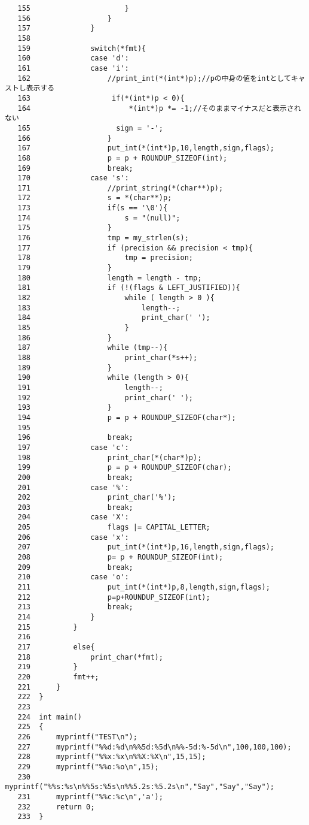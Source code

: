 \documentclass[a4j,11pt]{jarticle}
\begin{document}
\begin{verbatim}
   155	                    }
   156	                }
   157	            }
   158	
   159	            switch(*fmt){
   160	            case 'd':
   161	            case 'i':
   162	                //print_int(*(int*)p);//pの中身の値をintとしてキャストし表示する
   163	                 if(*(int*)p < 0){
   164	                     *(int*)p *= -1;//そのままマイナスだと表示されない
   165	                  sign = '-';
   166	                }
   167	                put_int(*(int*)p,10,length,sign,flags);
   168	                p = p + ROUNDUP_SIZEOF(int);
   169	                break;
   170	            case 's':
   171	                //print_string(*(char**)p);
   172	                s = *(char**)p;
   173	                if(s == '\0'){
   174	                    s = "(null)";
   175	                }
   176	                tmp = my_strlen(s);
   177	                if (precision && precision < tmp){
   178	                    tmp = precision;
   179	                }
   180	                length = length - tmp;
   181	                if (!(flags & LEFT_JUSTIFIED)){   
   182	                    while ( length > 0 ){
   183	                        length--;
   184	                        print_char(' ');
   185	                    } 
   186	                }
   187	                while (tmp--){
   188	                    print_char(*s++);
   189	                }
   190	                while (length > 0){
   191	                    length--;
   192	                    print_char(' ');
   193	                }
   194	                p = p + ROUNDUP_SIZEOF(char*);
   195	
   196	                break;
   197	            case 'c':
   198	                print_char(*(char*)p);
   199	                p = p + ROUNDUP_SIZEOF(char);
   200	                break;
   201	            case '%':
   202	                print_char('%');
   203	                break;
   204	            case 'X':
   205	                flags |= CAPITAL_LETTER;
   206	            case 'x':
   207	                put_int(*(int*)p,16,length,sign,flags);
   208	                p= p + ROUNDUP_SIZEOF(int);
   209	                break;
   210	            case 'o':
   211	                put_int(*(int*)p,8,length,sign,flags);
   212	                p=p+ROUNDUP_SIZEOF(int);
   213	                break;
   214	            }
   215	        }
   216	
   217	        else{
   218	            print_char(*fmt);
   219	        }
   220	        fmt++;
   221	    }
   222	}
   223	
   224	int main()
   225	{
   226	    myprintf("TEST\n");
   227	    myprintf("%%d:%d\n%%5d:%5d\n%%-5d:%-5d\n",100,100,100);
   228	    myprintf("%%x:%x\n%%X:%X\n",15,15);
   229	    myprintf("%%o:%o\n",15);
   230	    myprintf("%%s:%s\n%%5s:%5s\n%%5.2s:%5.2s\n","Say","Say","Say");
   231	    myprintf("%%c:%c\n",'a');
   232	    return 0;
   233	}
\end{verbatim}
\end{document}
